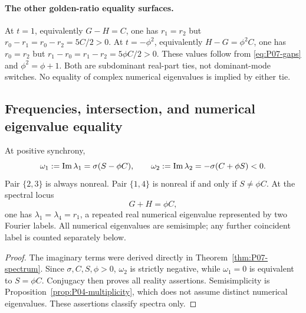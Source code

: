 \paragraph{The other golden-ratio equality surfaces.}
At $t=1$, equivalently $G-H=C$, one has $r_1=r_2$ but
$r_0-r_1=r_0-r_2=5C/2>0$. At $t=-\phi^2$, equivalently
$H-G=\phi^2C$, one has $r_0=r_2$ but
$r_1-r_0=r_1-r_2=5\phi C/2>0$.
These values follow from \eqref{eq:P07-gaps} and $\phi^2=\phi+1$.
Both are subdominant real-part ties, not dominant-mode switches.
No equality of complex numerical eigenvalues is implied by either tie.

\subsection{Frequencies, intersection, and numerical eigenvalue equality}
\begin{proposition}
\label{prop:P07-frequency}
At positive synchrony,
\begin{equation}
 \omega_1:=\operatorname{Im}\lambda_1=\sigma(S-\phi C),\qquad
 \omega_2:=\operatorname{Im}\lambda_2=-\sigma(C+\phi S)<0.
 \label{eq:P07-frequency}
\end{equation}
Pair $\{2,3\}$ is always nonreal. Pair $\{1,4\}$ is nonreal
if and only if $S\ne\phi C$. At the spectral locus
\begin{equation}
 \boxed{G+H=\phi C,}\label{eq:P07-frequency-locus}
\end{equation}
one has $\lambda_1=\lambda_4=r_1$, a repeated real numerical
 eigenvalue represented by two Fourier labels. All numerical eigenvalues
are semisimple; any further coincident label is counted separately below.
\end{proposition}
\begin{proof}
The imaginary terms were derived directly in Theorem~\ref{thm:P07-spectrum}.
Since $\sigma,C,S,\phi>0$, $\omega_2$ is strictly negative, while
$\omega_1=0$ is equivalent to $S=\phi C$. Conjugacy then proves
all reality assertions. Semisimplicity is
Proposition~\ref{prop:P04-multiplicity}, which does not assume distinct
 numerical eigenvalues. These assertions classify spectra only.
\end{proof}

